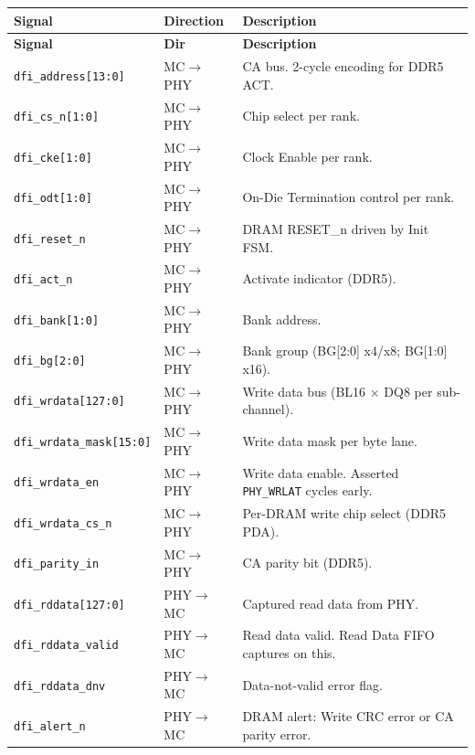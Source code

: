 \documentclass[11pt,a4paper]{article}
\newcommand{\reg}[1]{\textcolor{ddrpurple}{\texttt{#1}}}
\newcommand{\sig}[1]{\textcolor{ddrteal}{\texttt{#1}}}
\begin{document}
\begin{longtable}{L{4.8cm} C{2.2cm} L{7.5cm}}
\toprule
\textbf{Signal} & \textbf{Direction} & \textbf{Description} \\
\midrule
\endfirsthead\toprule\textbf{Signal}&\textbf{Dir}&\textbf{Description}\\\midrule\endhead
\bottomrule\endfoot

\sig{dfi\_address[13:0]}     & MC$\to$PHY & CA bus. 2-cycle encoding for DDR5 ACT. \\
\sig{dfi\_cs\_n[1:0]}        & MC$\to$PHY & Chip select per rank. \\
\sig{dfi\_cke[1:0]}          & MC$\to$PHY & Clock Enable per rank. \\
\sig{dfi\_odt[1:0]}          & MC$\to$PHY & On-Die Termination control per rank. \\
\sig{dfi\_reset\_n}          & MC$\to$PHY & DRAM RESET\_n driven by Init FSM. \\
\sig{dfi\_act\_n}            & MC$\to$PHY & Activate indicator (DDR5). \\
\sig{dfi\_bank[1:0]}         & MC$\to$PHY & Bank address. \\
\sig{dfi\_bg[2:0]}           & MC$\to$PHY & Bank group (BG[2:0] x4/x8; BG[1:0] x16). \\
\sig{dfi\_wrdata[127:0]}     & MC$\to$PHY & Write data bus (BL16 $\times$ DQ8 per sub-channel). \\
\sig{dfi\_wrdata\_mask[15:0]}& MC$\to$PHY & Write data mask per byte lane. \\
\sig{dfi\_wrdata\_en}        & MC$\to$PHY & Write data enable. Asserted \reg{PHY\_WRLAT} cycles early. \\
\sig{dfi\_wrdata\_cs\_n}     & MC$\to$PHY & Per-DRAM write chip select (DDR5 PDA). \\
\sig{dfi\_parity\_in}        & MC$\to$PHY & CA parity bit (DDR5). \\
\sig{dfi\_rddata[127:0]}     & PHY$\to$MC & Captured read data from PHY. \\
\sig{dfi\_rddata\_valid}     & PHY$\to$MC & Read data valid. Read Data FIFO captures on this. \\
\sig{dfi\_rddata\_dnv}       & PHY$\to$MC & Data-not-valid error flag. \\
\sig{dfi\_alert\_n}          & PHY$\to$MC & DRAM alert: Write CRC error or CA parity error. \\

\end{longtable}
\end{document}
